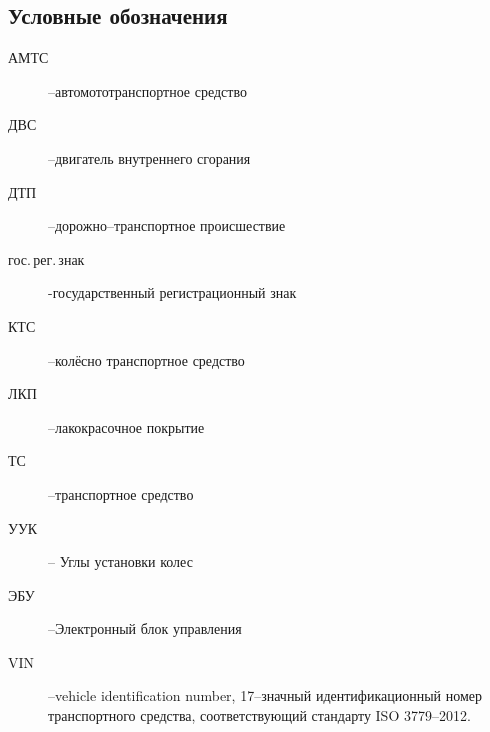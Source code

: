 \subsection{Условные обозначения}
\begin{description}
%	 
\item[АМТС] --автомототранспортное средство
\item[ДВС] --двигатель внутреннего сгорания
\item[ДТП] --дорожно--транспортное происшествие
\item[гос.\,рег.\,знак] -государственный регистрационный знак
\item[КТС] --колёсно транспортное средство 
\item[ЛКП] --лакокрасочное покрытие
\item[ТС] --транспортное средство
\item[УУК] -- Углы установки колес
\item[ЭБУ] --Электронный блок управления
\item[VIN] --vehicle identification number, 17--значный идентификационный номер транспортного средства, соответствующий стандарту ISO 3779--2012.
\end{description}

